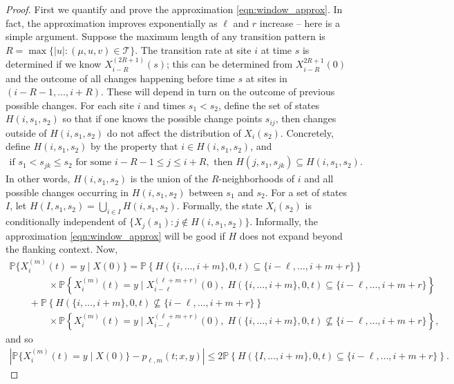 \documentclass{article}
\renewcommand{\P}{\mathbb{P}}
\newcommand{\calT}{\mathcal{T}}  %
\newcommand{\st}{\colon}  %
\theoremstyle{plain}
\theoremstyle{definition}
\begin{document}
\begin{proof}

First we quantify and prove the approximation \eqref{eqn:window_approx}.
In fact, the approximation improves exponentially as $\ell$ and $r$ increase --
here is a simple argument.
Suppose the maximum length of any transition pattern is $R = \max\{ |u| : (\mu,u,v) \in \calT \}$.
The transition rate at site $i$ at time $s$ is determined if we know $X_{i-R}^{(2R+1)}(s)$;
this can be determined from $X_{i-R}^{2R+1}(0)$ and the outcome of all changes happening before time $s$ at sites in $(i-R-1, \ldots, i+R)$.
These will depend in turn on the outcome of previous possible changes.
For each site $i$ and times $s_1 < s_2$, define the set of states $H(i,s_1,s_2)$
so that if one knows the possible change points $s_{ij}$,
then changes outside of $H(i,s_1,s_2)$ do not affect the distribution of $X_i(s_2)$.
Concretely, define $H(i,s_1,s_2)$ by the property that $i \in H(i,s_1,s_2)$, and
\begin{gather}
  \text{if } s_1 < s_{jk} \le s_2 \text{ for some } i-R-1 \le j \le i+R, \text{ then } H(j,s_1,s_{jk}) \subseteq H(i,s_1,s_2) .
\end{gather}
In other words, $H(i,s_1,s_2)$ is the union of the $R$-neighborhoods of $i$ and all possible changes occurring in $H(i,s_1,s_2)$ between $s_1$ and $s_2$.
For a set of states $I$, let $H(I,s_1,s_2) = \bigcup_{i\in I} H(i,s_1,s_2)$.
Formally, the state $X_i(s_2)$ is conditionally independent of $\{X_j(s_1) \st j \notin H(i,s_1,s_2)\}$.
Informally, the approximation \eqref{eqn:window_approx} will be good if $H$ does not expand beyond the flanking context.
Now,
\begin{multline}
  \P\{ X_i^{(m)}(t) = y \mid X(0) \}
  = \P\left\{ H(\{i,\ldots,i+m\},0,t)\subseteq\{i-\ell,\ldots,i+m+r\} \right\} \\
   \qquad \qquad {} \times \P\left\{ X_i^{(m)}(t) = y \mid X_{i-\ell}^{(\ell+m+r)}(0), \; H(\{i,\ldots,i+m\},0,t)\subseteq\{i-\ell,\ldots,i+m+r\} \right\} \\
     \qquad {} + \P\left\{ H(\{i,\ldots,i+m\},0,t)\nsubseteq\{i-\ell,\ldots,i+m+r\} \right\}  \\
   \qquad\qquad {} \times \P\left\{ X_i^{(m)}(t) = y \mid X_{i-\ell}^{(\ell+m+r)}(0), \; H(\{i,\ldots,i+m\},0,t)\nsubseteq\{i-\ell,\ldots,i+m+r\} \right\} ,
\end{multline}
and so
\begin{align} \label{eqn:prob_approx}
  \left| \P\{ X_i^{(m)}(t) = y \mid X(0) \} - p_{\ell,m}(t;x,y) \right| \le 2 \P\left\{  H(\{I,\ldots,i+m\},0,t)\subseteq\{i-\ell,\ldots,i+m+r\} \right\}.
\end{align}


\end{proof}
\end{document}
